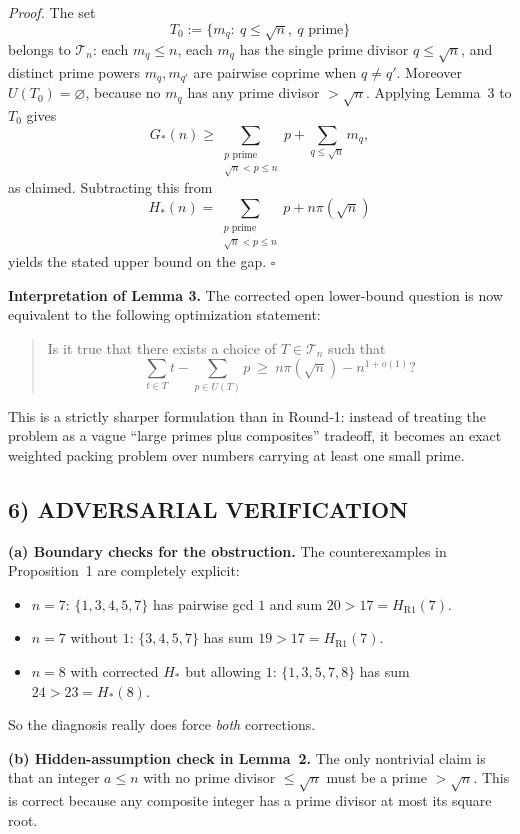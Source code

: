 \noindent\emph{Proof.}
The set
\[
T_0:=\{m_q:\ q\le \sqrt n,\ q\text{ prime}\}
\]
belongs to $\mathcal T_n$: each $m_q\le n$, each $m_q$ has the single prime divisor $q\le \sqrt n$, and distinct prime powers $m_q,m_{q'}$ are pairwise coprime when $q\ne q'$.
Moreover $U(T_0)=\varnothing$, because no $m_q$ has any prime divisor $>\sqrt n$.
Applying Lemma~3 to $T_0$ gives
\[
G_*(n)\ge \sum_{\substack{p\text{ prime}\\ \sqrt n<p\le n}}p + \sum_{q\le \sqrt n} m_q,
\]
as claimed.
Subtracting this from
\[
H_*(n)=\sum_{\substack{p\text{ prime}\\ \sqrt n<p\le n}}p+n\pi(\sqrt n)
\]
yields the stated upper bound on the gap.
\hfill$\square$

\medskip
\noindent\textbf{Interpretation of Lemma 3.}
The corrected open lower-bound question is now equivalent to the following optimization statement:
\begin{quote}
Is it true that there exists a choice of $T\in\mathcal T_n$ such that
\[
\sum_{t\in T}t-\sum_{p\in U(T)}p\ \ge\ n\pi(\sqrt n)-n^{1+o(1)}?
\]
\end{quote}
This is a strictly sharper formulation than in Round-1: instead of treating the problem as a vague ``large primes plus composites'' tradeoff, it becomes an exact weighted packing problem over numbers carrying at least one small prime.

\subsection*{6) ADVERSARIAL VERIFICATION}
\textbf{(a) Boundary checks for the obstruction.}
The counterexamples in Proposition~1 are completely explicit:
\begin{itemize}
\item $n=7$: $\{1,3,4,5,7\}$ has pairwise gcd $1$ and sum $20>17=H_{\mathrm{R1}}(7)$.
\item $n=7$ without $1$: $\{3,4,5,7\}$ has sum $19>17=H_{\mathrm{R1}}(7)$.
\item $n=8$ with corrected $H_*$ but allowing $1$: $\{1,3,5,7,8\}$ has sum $24>23=H_*(8)$.
\end{itemize}
So the diagnosis really does force \emph{both} corrections.

\textbf{(b) Hidden-assumption check in Lemma~2.}
The only nontrivial claim is that an integer $a\le n$ with no prime divisor $\le \sqrt n$ must be a prime $>\sqrt n$.
This is correct because any composite integer has a prime divisor at most its square root.

